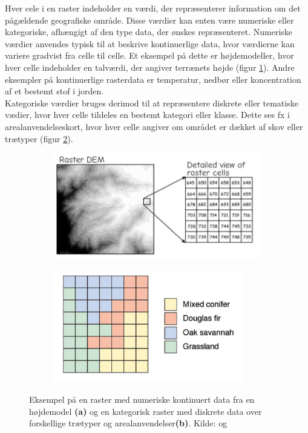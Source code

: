Hver cele i en raster indeholder en værdi, der repræsenterer information om det pågældende geografiske område. Disse værdier kan enten være numeriske eller kategoriske, afhængigt af den type data, der ønskes repræsenteret. Numeriske værdier anvendes typisk til at beskrive kontinuerlige data, hvor værdierne kan variere gradvist fra celle til celle. Et eksempel på dette er højdemodeller, hvor hver celle indeholder en talværdi, der angiver terrænets højde (figur \ref{Subfig: Kontinuer raster}). Andre eksempler på kontinuerlige rasterdata er temperatur, nedbør eller koncentration af et bestemt stof i jorden. \\
Kategoriske værdier bruges derimod til at repræsentere diskrete eller tematiske vædier, hvor hver celle tildeles en bestemt kategori eller klasse. Dette ses fx i arealanvendelseskort, hvor hver celle angiver om området er dækket af skov eller trætyper (figur \ref{Subfig: Kategorisk raster}).
\begin{figure}[H]
    \begin{subfigure} [t]{0.5\textwidth}
        \centering
        \includegraphics[width=1\linewidth]{images/teori/raster_kontinuert.jpg}
        \caption{}
        \label{Subfig: Kontinuer raster}
    \end{subfigure}
    \begin{subfigure} [t]{0.5\textwidth}
        \centering
        \includegraphics[width=1\linewidth]{images/teori/raster_areal.png}
        \caption{}
        \label{Subfig: Kategorisk raster}
    \end{subfigure}
    \caption{Eksempel på en raster med numeriske kontinuert data fra en højdemodel \textbf{(a)} og en kategorisk raster med diskrete data over forskellige trætyper og arealanvendelser\textbf{(b)}. Kilde: \cite[s. 66]{bolstad_gis_2022} og \cite[s. 67]{longley_geographical_2008}}
    \label{Figur: Kontinuert og kategorisk raster}
\end{figure}
